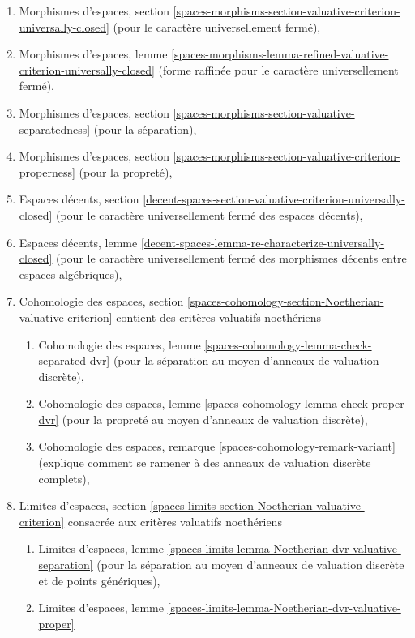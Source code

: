 \begin{enumerate}
\item Morphismes d'espaces, section
\ref{spaces-morphisms-section-valuative-criterion-universally-closed}
(pour le caractère universellement fermé),
\item Morphismes d'espaces, lemme
\ref{spaces-morphisms-lemma-refined-valuative-criterion-universally-closed}
(forme raffinée pour le caractère universellement fermé),
\item Morphismes d'espaces, section
\ref{spaces-morphisms-section-valuative-separatedness}
(pour la séparation),
\item Morphismes d'espaces, section
\ref{spaces-morphisms-section-valuative-criterion-properness}
(pour la propreté),
\item Espaces décents, section
\ref{decent-spaces-section-valuative-criterion-universally-closed}
(pour le caractère universellement fermé des espaces décents),
\item Espaces décents, lemme
\ref{decent-spaces-lemma-re-characterize-universally-closed}
(pour le caractère universellement fermé des morphismes décents entre espaces algébriques),
\item Cohomologie des espaces, section
\ref{spaces-cohomology-section-Noetherian-valuative-criterion}
contient des critères valuatifs noethériens
\begin{enumerate}
\item Cohomologie des espaces, lemme
\ref{spaces-cohomology-lemma-check-separated-dvr}
(pour la séparation au moyen d'anneaux de valuation discrète),
\item Cohomologie des espaces, lemme
\ref{spaces-cohomology-lemma-check-proper-dvr}
(pour la propreté au moyen d'anneaux de valuation discrète),
\item Cohomologie des espaces, remarque
\ref{spaces-cohomology-remark-variant}
(explique comment se ramener à des anneaux de valuation discrète complets),
\end{enumerate}
\item Limites d'espaces, section
\ref{spaces-limits-section-Noetherian-valuative-criterion}
consacrée aux critères valuatifs noethériens
\begin{enumerate}
\item Limites d'espaces, lemme
\ref{spaces-limits-lemma-Noetherian-dvr-valuative-separation}
(pour la séparation au moyen d'anneaux de valuation discrète et de points génériques),
\item Limites d'espaces, lemme
\ref{spaces-limits-lemma-Noetherian-dvr-valuative-proper}

\end{enumerate}
\end{enumerate}
